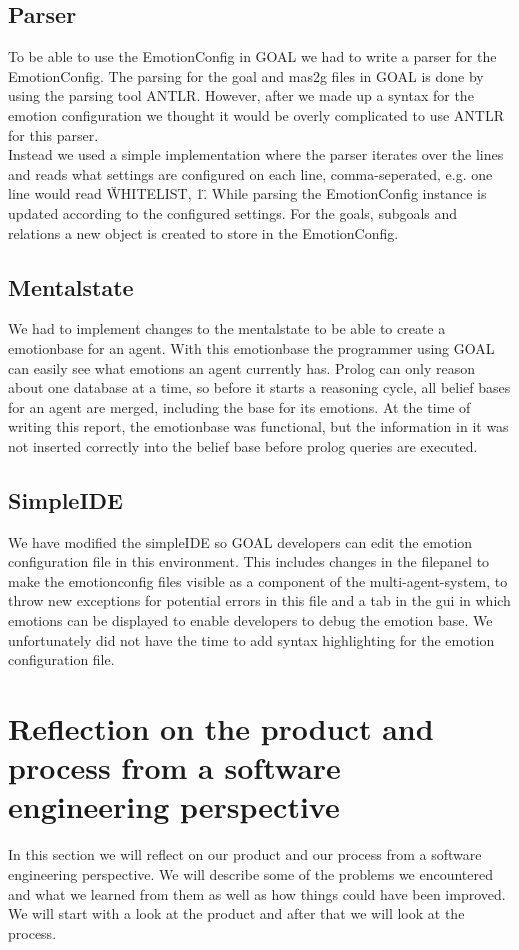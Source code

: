 \documentclass[11pt]{article}
\begin{document}
\subsection{Parser}
To be able to use the EmotionConfig in GOAL we had to write a parser for the EmotionConfig. The parsing for the goal and mas2g files in GOAL is done by using the parsing tool ANTLR. However, after we made up a syntax for the emotion configuration we thought it would be overly complicated to use ANTLR for this parser.\\
Instead we used a simple implementation where the parser iterates over the lines and reads what settings are configured on each line, comma-seperated, e.g. one line would read \"WHITELIST, 1\". While parsing the EmotionConfig instance is updated according to the configured settings. For the goals, subgoals and relations a new object is created to store in the EmotionConfig. 

\subsection{Mentalstate}
We had to implement changes to the mentalstate to be able to create a emotionbase for an agent. With this emotionbase the programmer using GOAL can easily see what emotions an agent currently has. Prolog can only reason about one database at a time, so before it starts a reasoning cycle, all belief bases for an agent are merged, including the base for its emotions. At the time of writing this report, the emotionbase was functional, but the information in it was not inserted correctly into the belief base before prolog queries are executed. 

\subsection{SimpleIDE}
We have modified the simpleIDE so GOAL developers can edit the emotion configuration file in this environment. This includes changes in the filepanel to make the emotionconfig files visible as a component of the multi-agent-system\cite{GOAL Env}, to throw new exceptions for potential errors in this file and a tab in the gui in which emotions can be displayed to enable developers to debug the emotion base. We unfortunately did not have the time to add syntax highlighting for the emotion configuration file. 

\clearpage

\section{Reflection on the product and process from a software engineering perspective}
In this section we will reflect on our product and our process from a software engineering perspective. We will describe some of the problems we encountered and what we learned from them as well as how things could have been improved. We will start with a look at the product and after that we will look at the process.
\end{document}
